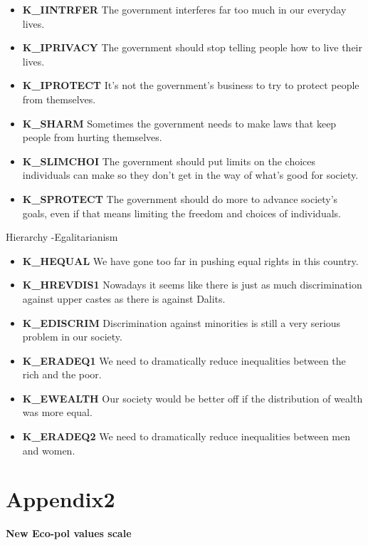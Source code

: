 \documentclass[
]{article}
\providecommand{\tightlist}{%
  \setlength{\itemsep}{0pt}\setlength{\parskip}{0pt}}
\begin{document}
\begin{itemize}
\tightlist
\item
  \textbf{K\_IINTRFER} The government interferes far too much in our
  everyday lives.
\item
  \textbf{K\_IPRIVACY} The government should stop telling people how to
  live their lives.
\item
  \textbf{K\_IPROTECT} It's not the government's business to try to
  protect people from themselves.
\item
  \textbf{K\_SHARM} Sometimes the government needs to make laws that
  keep people from hurting themselves.
\item
  \textbf{K\_SLIMCHOI} The government should put limits on the choices
  individuals can make so they don't get in the way of what's good for
  society.
\item
  \textbf{K\_SPROTECT} The government should do more to advance
  society's goals, even if that means limiting the freedom and choices
  of individuals.
\end{itemize}

Hierarchy -Egalitarianism

\begin{itemize}
\tightlist
\item
  \textbf{K\_HEQUAL} We have gone too far in pushing equal rights in
  this country.
\item
  \textbf{K\_HREVDIS1} Nowadays it seems like there is just as much
  discrimination against upper castes as there is against Dalits.
\item
  \textbf{K\_EDISCRIM} Discrimination against minorities is still a very
  serious problem in our society.
\item
  \textbf{K\_ERADEQ1} We need to dramatically reduce inequalities
  between the rich and the poor.
\item
  \textbf{K\_EWEALTH} Our society would be better off if the
  distribution of wealth was more equal.
\item
  \textbf{K\_ERADEQ2} We need to dramatically reduce inequalities
  between men and women.
\end{itemize}

\newpage

\hypertarget{appendix2}{%
\section{Appendix2}\label{appendix2}}

\textbf{New Eco-pol values scale}
\end{document}
